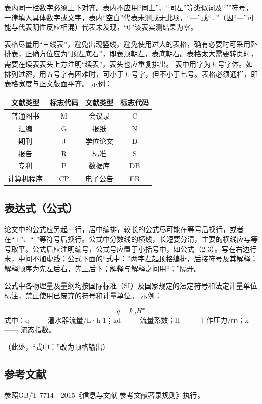 表内同一栏数字必须上下对齐。表内不应用“同上”、“同左”等类似词及“″”符号，一律填入具体数字或文字，表内“空白”代表未测或无此项，“—”或“…”（因“—”可能与代表阴性反应相混）代表未发现，“0”该表实测结果为零。

表格尽量用“三线表”，避免出现竖线，避免使用过大的表格，确有必要时可采用卧排表，正确方位应为“顶左底右”，即表顶朝左，表底朝右。表格太大需要转页时，需要在续表表头上方注明“续表”，表头也应重复排出。
表中用字为五号字体。如排列过密，用五号字有困难时，可小于五号字，但不小于七号。表格必须通栏，即表格宽度与正文版面平齐。
示例：
\begin{table}[htp]
    \centering
    \begin{tabular}{|c|c|c|c|}
    \hline
    文献类型  & 标志代码 & 文献类型 & 标志代码 \\ \hline
    普通图书  & M    & 会议录  & C    \\ \hline
    汇编    & G    & 报纸   & N    \\ \hline
    期刊    & J    & 学位论文 & D    \\ \hline
    报告    & R    & 标准   & S    \\ \hline
    专利    & P    & 数据库  & DB   \\ \hline
    计算机程序 & CP   & 电子公告 & EB   \\ \hline
    \end{tabular}
    \label{tab:demo}    
\end{table}
\subsection{表达式（公式）}
论文中的公式应另起一行，居中编排，较长的公式尽可能在等号后换行，或者在“+”、“-”等符号后换行。公式中分数线的横线，长短要分清，主要的横线应与等号取平。公式后应注明编号，公式号应置于小括号中，如公式（2-3）。写在右边行末，中间不加虚线；公式下面的“式中：”两字左起顶格编排，后接符号及其解释；解释顺序为先左后右，先上后下；解释与解释之间用“；”隔开。

公式中各物理量及量纲均按国际标准（SI）及国家规定的法定符号和法定计量单位标注，禁止使用已废弃的符号和计量单位。
示例：

\begin{equation}
    \label{eq:demo}
    q=k_dH^x
\end{equation}
式中：q —— 灌水器流量/L·h-1；kd —— 流量系数；H —— 工作压力/ｍ；x —— 流态指数。

（此处，“式中：”改为顶格输出）

\subsection{参考文献}
参照GB/T 7714—2015《信息与文献 参考文献著录规则》执行。
